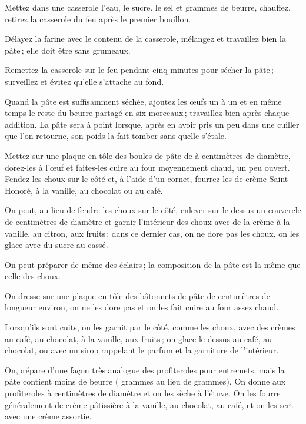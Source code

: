 Mettez dans une casserole l'eau, le sucre. le sel et {\mmm} grammes de
beurre, chauffez, retirez la casserole du feu après le premier bouillon.

Délayez la farine avec le contenu de la casserole, mélangez et travaillez bien
la pâte ; elle doit être sans grumeaux.

Remettez la casserole sur le feu pendant cinq minutes pour sécher la pâte ;
surveillez et évitez qu'elle s'attache au fond.

Quand la pâte est suffisamment séchée, ajoutez les œufs un à un et en même
temps le reste du beurre partagé en six morceaux ; travaillez bien après chaque
addition. La pâte sera à point lorsque, après en avoir pris un peu dans une
cuiller que l'on retourne, son poids la fait tomber sans quelle s'étale.

Mettez sur une plaque en tôle des boules de pâte de {\mmm} à {\mmm}
centimètres de diamètre, dorez-les à l'œuf et faites-les cuire au four
moyennement chaud, un peu ouvert. Fendez les choux sur le côté et, à l’aide
d'un cornet, fourrez-les de crème Saint-Honoré, à la vanille, au chocolat ou au
café.

On peut, au lieu de fendre les choux sur le côté, enlever sur le dessus un
couvercle de {\mmm} centimètres de diamètre et garnir l'intérieur des
choux avec de la crème à la vanille, au citron, aux fruits ; dans ce dernier
cas, on ne dore pas les choux, on les glace avec du sucre au cassé.

\sk

On peut préparer de même des éclairs ; la composition de la pâte est la même
que celle des choux.

On dresse sur une plaque en tôle des bâtonnets de pâte de {\mmm}
centimètres de longueur environ, on ne les dore pas et on les fait cuire au
four assez chaud.

Lorsqu'ils sont cuits, on les garnit par le côté, comme les choux, avec des
crèmes au café, au chocolat, à la vanille, aux fruits ; on glace le dessus au
café, au chocolat, ou avec un sirop rappelant le parfum et la garniture de
l'intérieur.

\sk

On,prépare d'une façon très analogue des profiteroles pour entremets, mais la
pâte contient moins de beurre ({\mmm} grammes au lieu de {\mmm}
grammes). On donne aux profiteroles {\mmm} à {\mmm} centimètres de
diamètre et on les sèche à l'étuve. On les fourre généralement de crème
pâtissière à la vanille, au chocolat, au café, et on les sert avec une crème
assortie.

